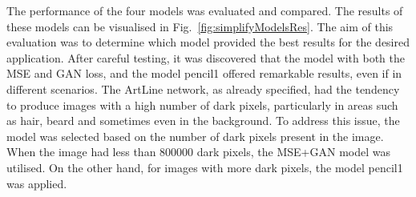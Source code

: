 \noindent The performance of the four models was evaluated and compared. The results of these models can be visualised in Fig.~\ref{fig:simplifyModelsRes}. The aim of this evaluation was to determine which model provided the best results for the desired application. After careful testing, it was discovered that the model with both the MSE and GAN loss, and the model pencil1 offered remarkable results, even if in different scenarios. 
The ArtLine network, as already specified, had the tendency to produce images with a high number of dark pixels, particularly in areas such as hair,  beard and sometimes even in the background. To address this issue, the model was selected based on the number of dark pixels present in the image. When the image had less than \num{800000} dark pixels, the MSE+GAN model was utilised. On the other hand, for images with more dark pixels, the model pencil1 was applied.

